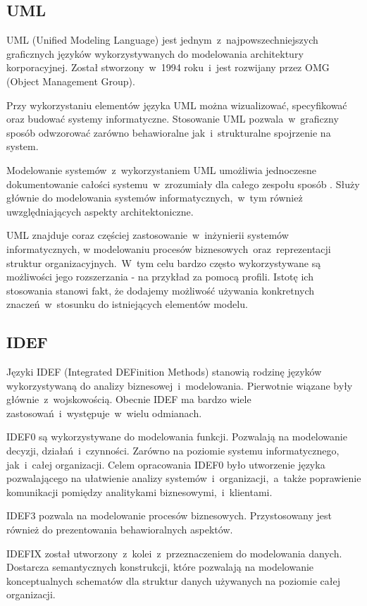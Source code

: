 \subsection{UML}
UML (Unified Modeling Language) jest jednym~z~najpowszechniejszych graficznych języków wykorzystywanych do modelowania architektury korporacyjnej. Został stworzony~w~1994 roku~i~jest rozwijany przez OMG (Object Management Group). 

Przy wykorzystaniu elementów języka UML można wizualizować, specyfikować oraz budować systemy informatyczne. Stosowanie UML pozwala~w~graficzny sposób odwzorować zarówno behawioralne jak~i~strukturalne spojrzenie na system.

Modelowanie systemów~z~wykorzystaniem UML umożliwia jednoczesne dokumentowanie całości systemu~w~zrozumiały dla całego zespołu sposób \cite{PlatIntGor}. Służy głównie do modelowania systemów informatycznych,~w~tym również uwzględniających aspekty architektoniczne. 

UML znajduje coraz częściej zastosowanie~w~inżynierii systemów informatycznych, w  modelowaniu procesów biznesowych~oraz~reprezentacji struktur organizacyjnych.~W~tym celu bardzo często wykorzystywane są możliwości jego rozszerzania - na przykład za pomocą profili. Istotę ich stosowania stanowi fakt, że dodajemy możliwość używania konkretnych znaczeń~w~stosunku do istniejących elementów modelu.


\subsection{IDEF}
Języki IDEF (Integrated DEFinition Methods) stanowią rodzinę języków wykorzystywaną do analizy biznesowej~i~modelowania. Pierwotnie wiązane były głównie~z~wojskowością.  Obecnie IDEF ma bardzo wiele zastosowań~i~występuje~w~wielu odmianach.

IDEF0 są wykorzystywane do modelowania funkcji. Pozwalają na modelowanie decyzji, działań~i~czynności. Zarówno na poziomie systemu informatycznego, jak~i~całej organizacji. Celem opracowania IDEF0 było utworzenie języka pozwalającego na ułatwienie analizy systemów~i~organizacji,~a~także poprawienie komunikacji pomiędzy analitykami biznesowymi,~i~klientami. 

IDEF3 pozwala na modelowanie procesów biznesowych. Przystosowany jest również do prezentowania behawioralnych aspektów. 

IDEFIX został utworzony~z~kolei~z~przeznaczeniem do modelowania danych. Dostarcza semantycznych konstrukcji, które pozwalają na modelowanie konceptualnych schematów dla struktur danych używanych na poziomie całej organizacji.


